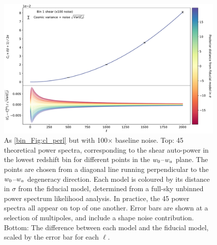 \begin{figure}[tp]
\includegraphics[width=\textwidth]{cl_perl_x100noise}
\caption{As \autoref{bin_Fig:cl_perl} but with 100$\times$ baseline noise. Top: 45 theoretical power spectra, corresponding to the shear auto-power in the lowest redshift bin for different points in the $w_0$--$w_a$ plane. The points are chosen from a diagonal line running perpendicular to the $w_0$--$w_a$ degeneracy direction. Each model is coloured by its distance in $\sigma$ from the fiducial model, determined from a full-sky unbinned power spectrum likelihood analysis. In practice, the 45 power spectra all appear on top of one another. Error bars are shown at a selection of multipoles, and include a shape noise contribution. Bottom: The difference between each model and the fiducial model, scaled by the error bar for each $\ell$.}
\label{bin_Fig:cl_perl_x100noise}
\end{figure}

